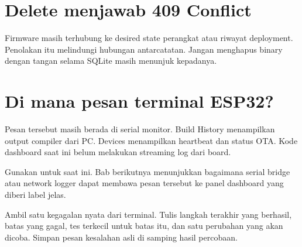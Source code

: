\section{Delete menjawab 409 Conflict}

Firmware masih terhubung ke desired state perangkat atau riwayat deployment. Penolakan itu melindungi hubungan antarcatatan. Jangan menghapus binary dengan tangan selama SQLite masih menunjuk kepadanya.

\section{Di mana pesan terminal ESP32?}

Pesan tersebut masih berada di serial monitor. Build History menampilkan output compiler dari PC. Devices menampilkan heartbeat dan status OTA. Kode dashboard saat ini belum melakukan streaming log dari board.

Gunakan  untuk saat ini. Bab berikutnya menunjukkan bagaimana serial bridge atau network logger dapat membawa pesan tersebut ke panel dashboard yang diberi label jelas.

\begin{checkpoint}
Ambil satu kegagalan nyata dari terminal. Tulis langkah terakhir yang berhasil, batas yang gagal, tes terkecil untuk batas itu, dan satu perubahan yang akan dicoba. Simpan pesan kesalahan asli di samping hasil percobaan.
\end{checkpoint}
